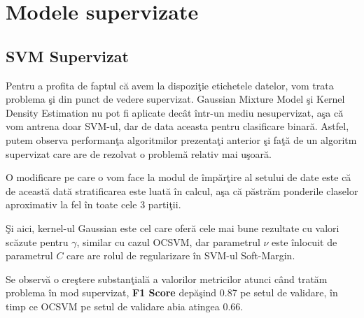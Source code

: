 \noindent

\section{Modele supervizate}

\subsection{SVM Supervizat}

Pentru a profita de faptul că avem la dispoziţie etichetele datelor, vom trata 
problema şi din punct de vedere supervizat. Gaussian Mixture Model şi Kernel 
Density Estimation nu pot fi aplicate decât într-un mediu nesupervizat, aşa 
că vom antrena doar SVM-ul, dar de data aceasta pentru clasificare binară.
Astfel, putem observa performanţa algoritmilor prezentaţi anterior şi faţă 
de un algoritm supervizat care are de rezolvat o problemă relativ mai uşoară.

O modificare pe care o vom face la modul de împărţire al setului de date 
este că de această dată stratificarea este luată în calcul, aşa că păstrăm 
ponderile claselor aproximativ la fel în toate cele 3 partiţii.

Şi aici, kernel-ul Gaussian este cel care oferă cele mai bune rezultate cu 
valori scăzute pentru $\gamma$, similar cu cazul OCSVM, dar parametrul 
$\nu$ este înlocuit
de parametrul $C$ care are rolul de regularizare în SVM-ul Soft-Margin.

Se observă o creştere substanţială a valorilor metricilor atunci când tratăm 
problema în mod supervizat, \textbf{F1 Score} 
depăşind 0.87 pe setul de validare, în timp ce 
OCSVM pe setul de validare abia atingea 0.66.

